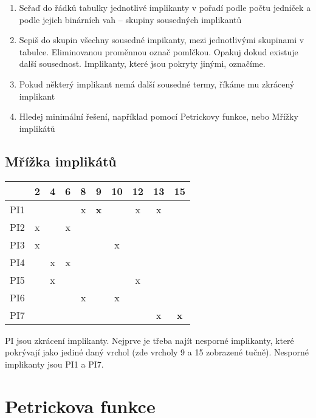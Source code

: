 \documentclass[a4paper, 11pt]{report}
\begin{document}
\begin{enumerate}
	\item Seřaď do řádků tabulky jednotlivé implikanty v pořadí podle počtu jedniček a podle jejich binárních vah -- skupiny sousedných implikantů
	\item Sepiš do skupin všechny sousedné impikanty, mezi jednotlivými skupinami v tabulce. Eliminovanou proměnnou označ pomlčkou. Opakuj dokud existuje další sousednost. Implikanty, které jsou pokryty jinými, označíme.
	\item Pokud některý implikant nemá další sousedné termy, říkáme mu zkrácený implikant
	\item Hledej minimální řešení, například pomocí Petrickovy funkce, nebo Mřížky implikátů
\end{enumerate}

\subsection{Mřížka implikátů}

\begin{tabular}{| c || c | c | c | c | c | c | c | c | c |}
	\hline
		& 2 & 4 & 6 & 8 & 9 & 10 & 12 & 13 & 15 \\ \hline \hline
	PI1	&   &   &   & x & \textbf{x} &    & x  & x  &    \\ \hline
	PI2	& x &   & x &   &   &    &    &    &    \\ \hline
	PI3	& x &   &   &   &   & x  &    &    &    \\ \hline
	PI4	&   & x & x &   &   &    &    &    &    \\ \hline
	PI5	&   & x &   &   &   &    & x  &    &    \\ \hline
	PI6	&   &   &   & x &   & x  &    &    &    \\ \hline
	PI7	&   &   &   &   &   &    &    & x  & \textbf{x}  \\ \hline
\end{tabular}

PI jsou zkrácení implikanty. Nejprve je třeba najít nesporné implikanty, které pokrývají jako jediné daný vrchol (zde vrcholy 9 a 15 zobrazené tučně). Nesporné implikanty jsou PI1 a PI7.

\section{Petrickova funkce}
\end{document}
